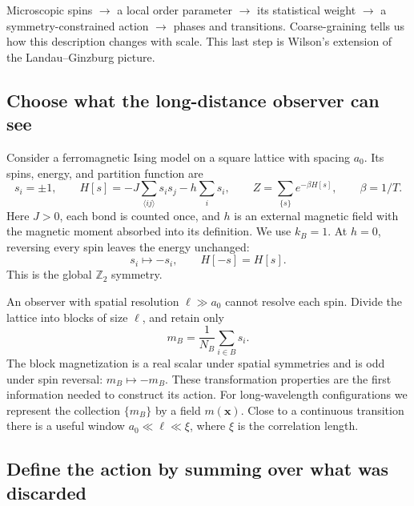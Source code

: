 \documentclass[11pt]{article}
\begin{document}
\begin{keyidea}
Microscopic spins \(\longrightarrow\) a local order parameter
\(\longrightarrow\) its statistical weight \(\longrightarrow\) a
symmetry-constrained action \(\longrightarrow\) phases and transitions.
Coarse-graining tells us how this description changes with scale. This last
step is Wilson's extension of the Landau--Ginzburg picture.
\end{keyidea}

\subsection{Choose what the long-distance observer can see}

Consider a ferromagnetic Ising model on a square lattice with spacing
\(a_0\). Its spins, energy, and partition function are
\begin{equation}
s_i=\pm1,\qquad
H[s]=-J\sum_{\langle ij\rangle}s_i s_j-h\sum_i s_i,
\qquad Z=\sum_{\{s\}}e^{-\beta H[s]},\qquad \beta=1/T.
\label{eq:Ising}
\end{equation}
Here \(J>0\), each bond is counted once, and \(h\) is an external magnetic
field with the magnetic moment absorbed into its definition. We use
\(k_B=1\). At \(h=0\), reversing every spin leaves the energy unchanged:
\begin{equation}
s_i\longmapsto-s_i,\qquad H[-s]=H[s].
\end{equation}
This is the global \(\mathbb Z_2\) symmetry.

An observer with spatial resolution \(\ell\gg a_0\) cannot resolve each
spin. Divide the lattice into blocks of size \(\ell\), and retain only
\begin{equation}
m_B=\frac{1}{N_B}\sum_{i\in B}s_i.
\label{eq:block}
\end{equation}
The block magnetization is a real scalar under spatial symmetries and is
odd under spin reversal: \(m_B\mapsto-m_B\). These transformation
properties are the first information needed to construct its action.
For long-wavelength configurations we represent the collection \(\{m_B\}\)
by a field \(m(\bm x)\). Close to a continuous transition there is a useful
window \(a_0\ll\ell\ll\xi\), where \(\xi\) is the correlation length.

\subsection{Define the action by summing over what was discarded}
\end{document}
